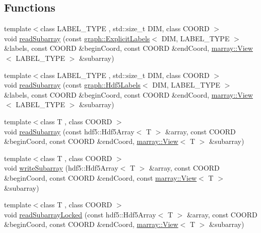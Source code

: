 \subsection*{Functions}
\begin{DoxyCompactItemize}
\item 
{\footnotesize template$<$class L\+A\+B\+E\+L\+\_\+\+T\+Y\+PE , std\+::size\+\_\+t D\+IM, class C\+O\+O\+RD $>$ }\\void \hyperlink{namespacenifty_1_1tools_a5d64102d01cdba610156da964f4b2581}{read\+Subarray} (const \hyperlink{classnifty_1_1graph_1_1ExplicitLabels}{graph\+::\+Explicit\+Labels}$<$ D\+IM, L\+A\+B\+E\+L\+\_\+\+T\+Y\+PE $>$ \&labels, const C\+O\+O\+RD \&begin\+Coord, const C\+O\+O\+RD \&end\+Coord, \hyperlink{classandres_1_1View}{marray\+::\+View}$<$ L\+A\+B\+E\+L\+\_\+\+T\+Y\+PE $>$ \&subarray)
\item 
{\footnotesize template$<$class L\+A\+B\+E\+L\+\_\+\+T\+Y\+PE , std\+::size\+\_\+t D\+IM, class C\+O\+O\+RD $>$ }\\void \hyperlink{namespacenifty_1_1tools_a32fca5240a87f007e50dac403671cfa0}{read\+Subarray} (const \hyperlink{classnifty_1_1graph_1_1Hdf5Labels}{graph\+::\+Hdf5\+Labels}$<$ D\+IM, L\+A\+B\+E\+L\+\_\+\+T\+Y\+PE $>$ \&labels, const C\+O\+O\+RD \&begin\+Coord, const C\+O\+O\+RD \&end\+Coord, \hyperlink{classandres_1_1View}{marray\+::\+View}$<$ L\+A\+B\+E\+L\+\_\+\+T\+Y\+PE $>$ \&subarray)
\item 
{\footnotesize template$<$class T , class C\+O\+O\+RD $>$ }\\void \hyperlink{namespacenifty_1_1tools_a8b0e46da1e0ed94de12c1ea0b89a07d9}{read\+Subarray} (const hdf5\+::\+Hdf5\+Array$<$ T $>$ \&array, const C\+O\+O\+RD \&begin\+Coord, const C\+O\+O\+RD \&end\+Coord, \hyperlink{classandres_1_1View}{marray\+::\+View}$<$ T $>$ \&subarray)
\item 
{\footnotesize template$<$class T , class C\+O\+O\+RD $>$ }\\void \hyperlink{namespacenifty_1_1tools_a46fa9e03448a433ba5ca485435b540b8}{write\+Subarray} (hdf5\+::\+Hdf5\+Array$<$ T $>$ \&array, const C\+O\+O\+RD \&begin\+Coord, const C\+O\+O\+RD \&end\+Coord, const \hyperlink{classandres_1_1View}{marray\+::\+View}$<$ T $>$ \&subarray)
\item 
{\footnotesize template$<$class T , class C\+O\+O\+RD $>$ }\\void \hyperlink{namespacenifty_1_1tools_a562317b7926e706fa893b03ad3bfdfda}{read\+Subarray\+Locked} (const hdf5\+::\+Hdf5\+Array$<$ T $>$ \&array, const C\+O\+O\+RD \&begin\+Coord, const C\+O\+O\+RD \&end\+Coord, \hyperlink{classandres_1_1View}{marray\+::\+View}$<$ T $>$ \&subarray)

\end{DoxyCompactItemize}
